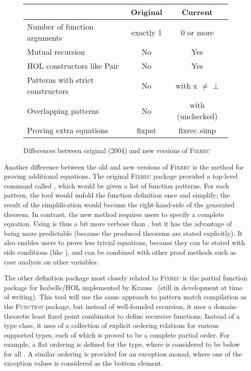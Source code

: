 \begin{figure}
\centering
\begin{tabular}{lcc}
& Original & Current \\
\hline
Number of function arguments & exactly 1 & 0 or more \\
Mutual recursion & No & Yes \\
HOL constructors like \textsf{Pair} & No & Yes \\
Patterns with strict constructors & No & with \textsf{x {$\neq$} {$\bot$}} \\
Overlapping patterns & No & with \textsf{(unchecked)} \\
Proving extra equations & \textsf{fixpat} & \textsf{fixrec$\mathunderscore$simp} \\
\hline
\end{tabular}
\caption{Differences between original (2004) and new versions of \textsc{Fixrec}}
\label{fig:fixrec-comparison}
\end{figure}

Another difference between the old and new versions of \textsc{Fixrec} is the method for proving additional equations. The original \textsc{Fixrec} package provided a top-level command called , which would be given a list of function patterns. For each pattern, the tool would unfold the function definition once and simplify; the result of the simplification would become the right-hand-side of the generated theorem. In contrast, the new  method requires users to specify a complete equation. Using  is thus a bit more verbose than , but it has the advantage of being more predictable (because the produced theorems are stated explicitly). It also enables users to prove less trivial equations, because they can be stated with side conditions (like ), and  can be combined with other proof methods such as case analysis on other variables.

The other definition package most closely related to \textsc{Fixrec} is the partial function package for Isabelle/HOL implemented by Krauss~\cite{Krauss10b} (still in development at time of writing). This tool will use the same approach to pattern match compilation as the \textsc{Function} package, but instead of well-founded recursion, it uses a domain-theoretic least fixed point combinator to define recursive functions. Instead of a  type class, it uses of a collection of explicit ordering relations for various supported types, each of which is proved to be a complete partial order. For example, a flat ordering is defined for the  type, where  is considered to be below  for all . A similar ordering is provided for an exception monad, where one of the exception values is considered as the bottom element.

